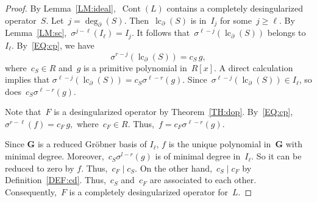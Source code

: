 \documentclass{sig-alternate}
\newcommand{\cont}{\operatorname{Cont}}
\newcommand{\lc}{\operatorname{lc}}
\newcommand{\si} { {\sigma}}
\newcommand{\pa}{\partial}
\begin{document}
\begin{proof}
By Lemma~\ref{LM:ideal},~$\cont(L)$ contains a completely desingularized operator~$S$.
Let~$j=\deg_\pa(S)$. Then~$\lc_\pa(S)$ is in~$I_j$ for some~$j \ge \ell$.
By Lemma~\ref{LM:sc},~$\sigma^{j-\ell}(I_\ell)=I_j$. It follows that~$\si^{\ell - j}(\lc_\pa(S))$ belongs to $I_\ell$.
By~\eqref{EQ:cp}, we have
\[\sigma^{r - j}\left(\lc_\pa(S)\right) = c_S \, g, \]
where~$c_S \in R$ and~$g$ is a primitive polynomial in~$R[x]$.
A direct calculation implies that $\si^{\ell - j}(\lc_\pa(S)) = c_S \si^{\ell - r}(g)$.
Since~$\si^{\ell - j}(\lc_\pa(S)) \in I_\ell$,  so does~$c_S \si^{\ell - r}(g)$.

Note that~$F$ is a desingularized operator by Theorem~\ref{TH:dop}. By~\eqref{EQ:cp},~$\sigma^{r - \ell}\left(f\right) = c_F \, g,$
where~$c_F \in R$. Thus,~$f = c_F \si^{\ell - r}(g)$.


Since $\mathbf{G}$ is a reduced Gr\"obner basis of $I_\ell$, $f$ is the unique polynomial in~$\mathbf{G}$ with minimal degree.
Moreover,~$c_S \si^{l - r}(g)$ is of minimal degree in~$I_\ell$. So it can be reduced to zero by $f$. Thus,~$c_F \mid c_S$.
On the other hand,~$c_S \mid c_F$ by Definition~\ref{DEF:cd}. Thus,~$c_S$ and~$c_F$ are associated to each other. Consequently,~$F$ is a completely desingularized operator for~$L$.
\end{proof}
\end{document}
